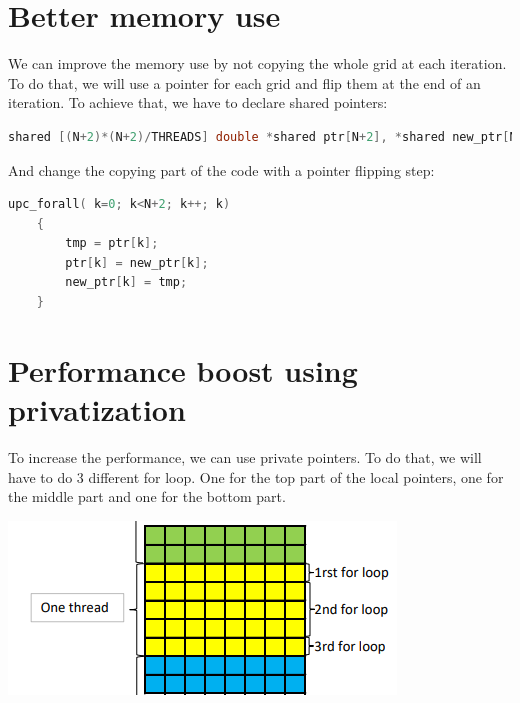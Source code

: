 \documentclass{report}
\begin{document}
\section{Better memory use}

We can improve the memory use by not copying the whole grid at each iteration. To do that, we will use a pointer for each grid and flip them at the end of an iteration.\newline
To achieve that, we have to declare shared pointers:
\begin{lstlisting}[language=c]
shared [(N+2)*(N+2)/THREADS] double *shared ptr[N+2], *shared new_ptr[N+2];
\end{lstlisting}
And change the copying part of the code with a pointer flipping step:

\begin{lstlisting}[language=c]
upc_forall( k=0; k<N+2; k++; k)
    {   
        tmp = ptr[k];
        ptr[k] = new_ptr[k];
        new_ptr[k] = tmp;
    }
\end{lstlisting}

\section{Performance boost using privatization}

To increase the performance, we can use private pointers. To do that, we will have to do 3 different for loop. One for the top part of the local pointers, one for the middle part and one for the bottom part.

\begin{center}
    \includegraphics[scale=1]{Images/for_loop_distribution.png}
    \label{fig6}
\end{center}
\end{document}
